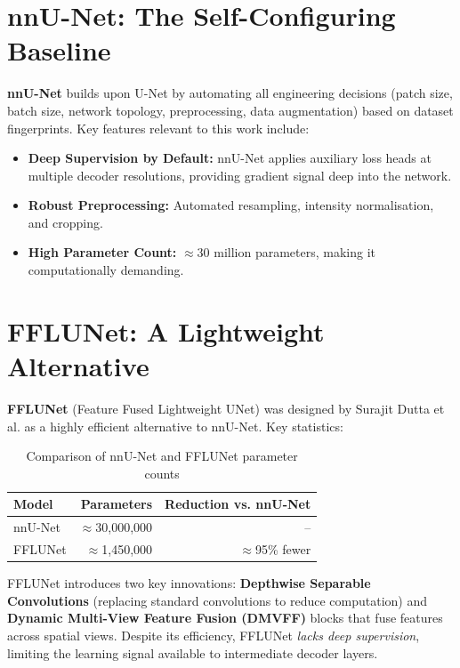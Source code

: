 \documentclass[12pt,a4paper]{report}
\begin{document}
\section{nnU-Net: The Self-Configuring Baseline}

\textbf{nnU-Net} \cite{isensee2021} builds upon U-Net by automating all engineering decisions (patch size, batch size, network topology, preprocessing, data augmentation) based on dataset fingerprints. Key features relevant to this work include:
\begin{itemize}[leftmargin=*]
    \item \textbf{Deep Supervision by Default:} nnU-Net applies auxiliary loss heads at multiple decoder resolutions, providing gradient signal deep into the network.
    \item \textbf{Robust Preprocessing:} Automated resampling, intensity normalisation, and cropping.
    \item \textbf{High Parameter Count:} $\approx$30 million parameters, making it computationally demanding.
\end{itemize}

\section{FFLUNet: A Lightweight Alternative}

\textbf{FFLUNet} (Feature Fused Lightweight UNet) \cite{duttafflunet} was designed by Surajit Dutta et al. as a highly efficient alternative to nnU-Net. Key statistics:

\begin{table}[H]
\centering
\caption{Comparison of nnU-Net and FFLUNet parameter counts}
\label{tab:param_compare}
\begin{tabular}{lrr}
\toprule
\textbf{Model} & \textbf{Parameters} & \textbf{Reduction vs. nnU-Net} \\
\midrule
nnU-Net & $\approx$30,000,000 & -- \\
FFLUNet & $\approx$1,450,000 & $\approx$95\% fewer \\
\bottomrule
\end{tabular}
\end{table}

FFLUNet introduces two key innovations: \textbf{Depthwise Separable Convolutions} (replacing standard convolutions to reduce computation) and \textbf{Dynamic Multi-View Feature Fusion (DMVFF)} blocks that fuse features across spatial views. Despite its efficiency, FFLUNet \textit{lacks deep supervision}, limiting the learning signal available to intermediate decoder layers.
\end{document}
